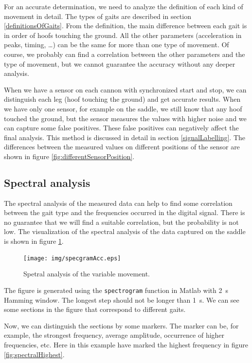 For an accurate determination, we need to analyze the definition of each kind of movement in detail. The types of gaits are described in section \ref{definitionsOfGaits}. From the definition, the main difference between each gait is in order of hoofs touching the ground. All the other parameters (acceleration in peaks, timing, \dots) can be the same for more than one type of movement. Of course, we probably can find a correlation between the other parameters and the type of movement, but we cannot guarantee the accuracy without any deeper analysis.

When we have a sensor on each cannon with synchronized start and stop, we can distinguish each leg (hoof touching the ground) and get accurate results. When we have only one sensor, for example on the saddle, we still know that any hoof touched the ground, but the sensor measures the values with higher noise and we can capture some false positives. These false positives can negatively affect the final analysis. This method is discussed in detail in section \ref{signalLabelling}. The differences between the measured values on different positions of the sensor are shown in figure \ref{fig:differentSensorPosition}.

\subsection{Spectral analysis}
\label{spectralAnalysis}
The spectral analysis of the measured data can help to find some correlation between the gait type and the frequencies occurred in the digital signal. There is no guarantee that we will find a suitable correlation, but the probability is not low. The visualization of the spectral analysis of the data captured on the saddle is shown in figure \ref{fig:spectralAnalysis}.

\begin{figure}
    \centering
    \caption{Spetral analysis of the variable movement.}
    \label{fig:spectralAnalysis}
    \texttt{[image: img/specgramAcc.eps]}
\end{figure}

The figure is generated using the \texttt{spectrogram} function in Matlab with \SI{2}{s} Hamming window. The longest step should not be longer than \SI{1}{s}. We can see some sections in the figure that correspond to different gaits.

Now, we can distinguish the sections by some markers. The marker can be, for example, the strongest frequency, average amplitude, occurrence of higher frequencies, etc. Here in this example have marked the highest frequency in figure \ref{fig:spectralHighest}.

